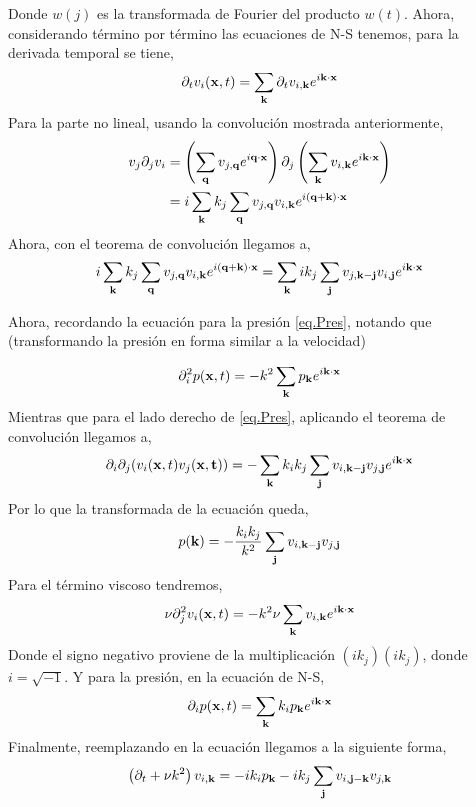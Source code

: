 \documentclass[executivepaper,12pt]{article}
\numberwithin{equation}{section}
\begin{document}
Donde $w(j)$ es la transformada de Fourier del producto $w(t)$. Ahora, considerando término por término las ecuaciones de N-S tenemos, para la derivada temporal se tiene,
\begin{equation*}
	\partial_tv_i(\vb{x},t)=\sum_{\vb{k}}\partial_tv_{i,\vb{k}}e^{i\vb{k}\cdot\vb{x}}
\end{equation*}
Para la parte no lineal, usando la convolución mostrada anteriormente,
\begin{align*}
	v_j\partial_jv_i&=\left(\sum_{\vb{q}}v_{j,\vb{q}}e^{i\vb{q}\cdot\vb{x}}\right)\partial_j\left(\sum_{\vb{k}}v_{i,\vb{k}}e^{i\vb{k}\cdot\vb{x}}\right)\\
	&=i\sum_{\vb{k}}k_j \sum_{\vb{q}}v_{j,\vb{q}}v_{i,\vb{k}}e^{i(\vb{q}+\vb{k})\cdot\vb{x}}
\end{align*}
Ahora, con el teorema de convolución llegamos a,
\begin{equation*}
	i\sum_{\vb{k}}k_j \sum_{\vb{q}}v_{j,\vb{q}}v_{i,\vb{k}}e^{i(\vb{q}+\vb{k})\cdot\vb{x}}=\sum_{\vb{k}} i k_j \sum_{\vb{j}}v_{j,\vb{k}-\vb{j}}v_{i,\vb{j}}e^{i\vb{k}\cdot\vb{x}}
\end{equation*}

Ahora, recordando la ecuación para la presión \ref{eq.Pres}, notando que (transformando la presión en forma similar a la velocidad)

\begin{equation*}
	\partial_i^2 p(\vb{x},t)=-k^2\sum_{\vb{k}} p_{\vb{k}}e^{i\vb{k}\cdot\vb{x}}
\end{equation*}
Mientras que para el lado derecho de \ref{eq.Pres}, aplicando el teorema de convolución llegamos a,
\begin{equation*}
	\partial_i\partial_j(v_i(\vb{x},t)v_j(\vb{x,t}))=-\sum_{\vb{k}} k_i k_j \sum_{\vb{j}}v_{i,\vb{k-j}}v_{j,\vb{j}} e^{i\vb{k\cdot\vb{x}}}
\end{equation*} 
Por lo que la transformada de la ecuación queda,
\begin{equation*}
	p(\vb{k})=-\frac{k_ik_j}{k^2}\sum_{\vb{j}}v_{i,\vb{k-j}}v_{j,\vb{j}}
\end{equation*}
Para el término viscoso tendremos,
\begin{equation*}
	\nu \partial_j ^2 v_{i}(\vb{x},t)=-k^2\nu\sum_{\vb{k}}v_{i,\vb{k}} e^{i\vb{k}\cdot\vb{x}}
\end{equation*}
Donde el signo negativo proviene de la multiplicación $(ik_j)(ik_j)$, donde $i=\sqrt{-1}$. Y para la presión, en la ecuación de N-S,
\begin{equation*}
	\partial_i p(\vb{x},t)=\sum_{\vb{k}}k_ip_{\vb{k}}e^{i\vb{k}\cdot\vb{x}}
\end{equation*}
Finalmente, reemplazando en la ecuación llegamos a la siguiente forma,
\begin{equation*}
	\left(\partial_t +\nu k^2\right)v_{i,\vb{k}}=-ik_ip_{\vb{k}}-ik_j\sum_{\vb{j}}v_{i,\vb{j}-\vb{k}}v_{j,\vb{k}}
\end{equation*}
\end{document}
